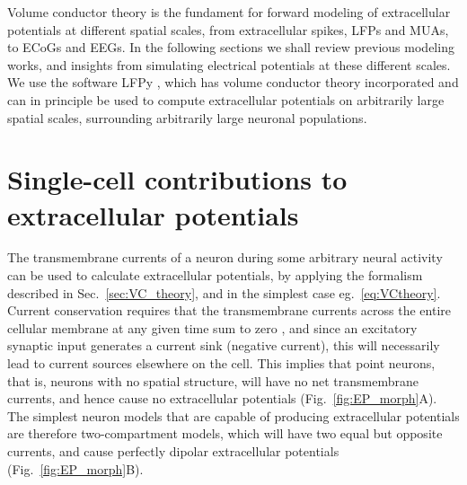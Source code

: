 \documentclass[preprint,11pt,authoryear]{elsarticle}
\newcommand{\hlb}[2][blue]{ {\sethlcolor{#1} \hl{#2}} }
\newcommand{\ghnote}[1]{\color{white}{\hlb{GH: #1 }}\color{black}}
\begin{document}
Volume conductor theory is the fundament for forward modeling of extracellular potentials at different spatial scales, from extracellular spikes, LFPs and MUAs, to ECoGs and EEGs. In the following sections we shall review previous modeling works, and insights from simulating electrical potentials at these different scales.
We use the software LFPy \citep{Linden2014, Hagen2018, Hagen2019}, which has volume conductor theory incorporated and can in principle be used to compute extracellular potentials on arbitrarily large spatial scales, surrounding arbitrarily large neuronal populations. 


\section{Single-cell contributions to extracellular potentials}



The transmembrane currents of a neuron during some arbitrary neural activity can be used to calculate extracellular potentials, by applying the formalism described in Sec.~\ref{sec:VC_theory}, and in the simplest case eg.~\ref{eq:VCtheory}.
Current conservation requires that the transmembrane currents across the entire cellular membrane at any given time sum to zero \citep{Koch1999, Nunez2006}, and since
an excitatory synaptic input generates a current sink (negative current), this will necessarily lead to current sources elsewhere on the cell. This implies that point neurons, that is, neurons with no spatial structure, will have no net transmembrane currents, and hence cause no extracellular potentials (Fig.~\ref{fig:EP_morph}A). The simplest neuron models that are capable of producing extracellular potentials are therefore two-compartment models, which will have two equal but opposite currents, and cause perfectly dipolar extracellular potentials (Fig.~\ref{fig:EP_morph}B).
\end{document}
